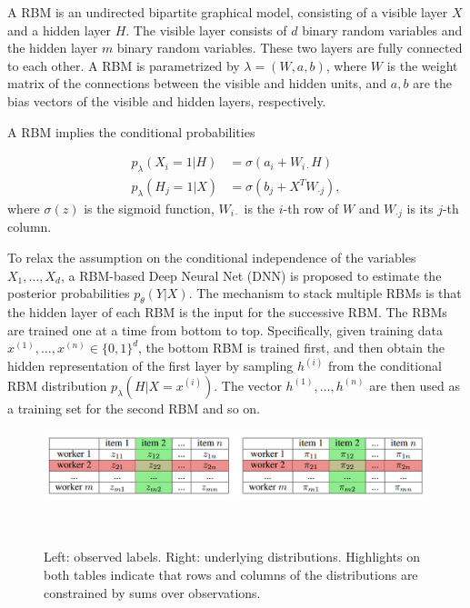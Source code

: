 \documentclass{article}
\begin{document}
A RBM is an undirected bipartite graphical model, consisting of a
visible layer $X$ and a hidden layer $H$. The visible layer consists
of $d$ binary random variables and the hidden layer $m$ binary random
variables. These two layers are fully connected to each other. A RBM
is parametrized by $\lambda = (W, a, b)$, where $W$ is the weight
matrix of the connections between the visible and hidden units, and
$a,b$ are the bias vectors of the visible and hidden layers,
respectively.

A RBM implies the conditional probabilities

\begin{align*}
p_{\lambda}(X_i=1|H) &= \sigma (a_i+W_{i\cdot}H) \\
p_{\lambda}(H_j=1|X) &= \sigma (b_j+X^{T}W_{\cdot j}),
\end{align*}
where $\sigma (z)$ is the sigmoid function, $W_{i\cdot}$ is the $i$-th
row of $W$ and $W_{\cdot j}$ is its $j$-th column.

To relax the assumption on the conditional independence of the
variables $X_1,\ldots,X_d$, a RBM-based Deep Neural Net (DNN) is
proposed to estimate the posterior probabilities
$p_{\theta}(Y|X)$. The mechanism to stack multiple RBMs is that the
hidden layer of each RBM is the input for the successive RBM. The RBMs
are trained one at a time from bottom to top. Specifically, given
training data $x^{(1)}, \ldots, x^{(n)} \in \{ 0,1 \}^d$, the bottom
RBM is trained first, and then obtain the hidden representation of the
first layer by sampling $h^{(i)}$ from the conditional RBM
distribution $p_{\lambda}(H|X=x^{(i)})$. The vector $h^{(1)}, \ldots,
h^{(n)}$ are then used as a training set for the second RBM and so on.

\begin{figure}[h]
  \centering
  \includegraphics[width=0.95\columnwidth]{minimax_entropy.png}
  \caption{Left: observed labels. Right: underlying
    distributions. Highlights on both tables indicate that rows and
    columns of the distributions are constrained by sums over observations.}
  ~\label{fg:minimax_entropy_model}
\end{figure}
\end{document}
